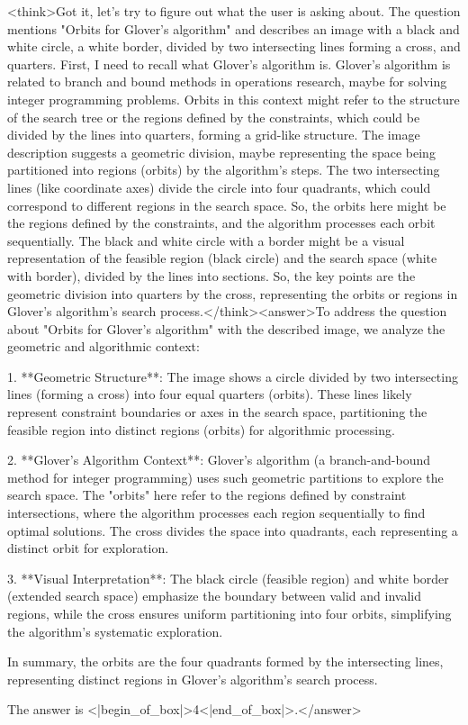 <think>Got it, let's try to figure out what the user is asking about. The question mentions "Orbits for Glover's algorithm" and describes an image with a black and white circle, a white border, divided by two intersecting lines forming a cross, and quarters. First, I need to recall what Glover's algorithm is. Glover's algorithm is related to branch and bound methods in operations research, maybe for solving integer programming problems. Orbits in this context might refer to the structure of the search tree or the regions defined by the constraints, which could be divided by the lines into quarters, forming a grid-like structure. The image description suggests a geometric division, maybe representing the space being partitioned into regions (orbits) by the algorithm's steps. The two intersecting lines (like coordinate axes) divide the circle into four quadrants, which could correspond to different regions in the search space. So, the orbits here might be the regions defined by the constraints, and the algorithm processes each orbit sequentially. The black and white circle with a border might be a visual representation of the feasible region (black circle) and the search space (white with border), divided by the lines into sections. So, the key points are the geometric division into quarters by the cross, representing the orbits or regions in Glover's algorithm's search process.</think><answer>To address the question about "Orbits for Glover's algorithm" with the described image, we analyze the geometric and algorithmic context:  

1. **Geometric Structure**: The image shows a circle divided by two intersecting lines (forming a cross) into four equal quarters (orbits). These lines likely represent constraint boundaries or axes in the search space, partitioning the feasible region into distinct regions (orbits) for algorithmic processing.  

2. **Glover's Algorithm Context**: Glover’s algorithm (a branch-and-bound method for integer programming) uses such geometric partitions to explore the search space. The "orbits" here refer to the regions defined by constraint intersections, where the algorithm processes each region sequentially to find optimal solutions. The cross divides the space into quadrants, each representing a distinct orbit for exploration.  

3. **Visual Interpretation**: The black circle (feasible region) and white border (extended search space) emphasize the boundary between valid and invalid regions, while the cross ensures uniform partitioning into four orbits, simplifying the algorithm’s systematic exploration.  

In summary, the orbits are the four quadrants formed by the intersecting lines, representing distinct regions in Glover’s algorithm’s search process.  

The answer is <|begin_of_box|>4<|end_of_box|>.</answer>
